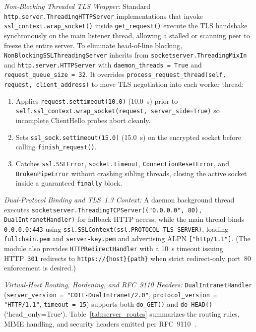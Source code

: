 \textit{Non-Blocking Threaded TLS Wrapper:} Standard \texttt{http.server.ThreadingHTTPServer} implementations that invoke \texttt{ssl\_context.wrap\_socket()} inside \texttt{get\_request()} execute the TLS handshake synchronously on the main listener thread, allowing a stalled or scanning peer to freeze the entire server. To eliminate head-of-line blocking, \texttt{NonBlockingSSLThreadingServer} inherits from \texttt{socketserver.ThreadingMixIn} and \texttt{http.server.HTTPServer} with \texttt{daemon\_threads = True} and \texttt{request\_queue\_size = 32}. It overrides \texttt{process\_request\_thread(self, request, client\_address)} to move TLS negotiation into each worker thread:
\begin{enumerate}
    \item Applies \texttt{request.settimeout(10.0)} (\qty{10.0}{\second}) prior to \texttt{self.ssl\_context.\allowbreak wrap\_socket(\allowbreak request, server\_side=True)} so incomplete ClientHello probes abort cleanly.
    \item Sets \texttt{ssl\_sock.settimeout(15.0)} (\qty{15.0}{\second}) on the encrypted socket before calling \texttt{finish\_request()}.
    \item Catches \texttt{ssl.SSLError}, \texttt{socket.timeout}, \texttt{ConnectionResetError}, and \texttt{BrokenPipeError} without crashing sibling threads, closing the active socket inside a guaranteed \texttt{finally} block.
\end{enumerate}

\textit{Dual-Protocol Binding and TLS~1.3 Context:} A daemon background thread executes \texttt{socketserver.\allowbreak ThreadingTCPServer(\allowbreak("0.0.0.0", 80), \allowbreak DualIntranetHandler)} for fallback HTTP access, while the main thread binds \texttt{0.0.0.0:443} using \texttt{ssl.SSLContext(ssl.PROTOCOL\_TLS\_SERVER)}, loading \nolinkurl{fullchain.pem} and \nolinkurl{server-key.pem} and advertising ALPN \texttt{["http/1.1"]}. (The module also provides \texttt{HTTPRedirectHandler} with a \qty{10}{\second} timeout issuing HTTP~\texttt{301} redirects to \texttt{https://\{host\}\{path\}} when strict redirect-only port~80 enforcement is desired.)

\textit{Virtual-Host Routing, Hardening, and RFC~9110 Headers:} \texttt{DualIntranetHandler} (\texttt{server\_version = "COIL-DualIntranet/2.0"}, \texttt{protocol\_version = "HTTP/1.1"}, \texttt{timeout = 15}) supports both \texttt{do\_GET()} and \texttt{do\_HEAD()} (`head\_only=True`). Table~\ref{tab:server_routes} summarizes the routing rules, MIME handling, and security headers emitted per RFC~9110~\cite{rfc9110}.

